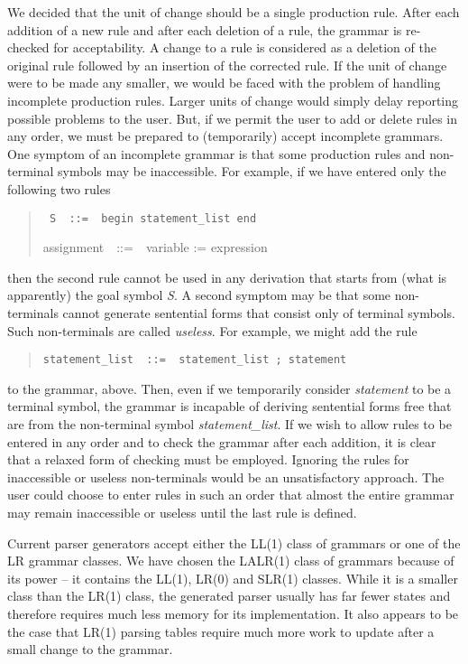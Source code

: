 We decided that the unit of change should be
a single production rule.
After each addition of a new rule and after each deletion of
a rule, the grammar is re-checked for acceptability.
A change to a rule is considered as a deletion of the original rule
followed by an insertion of the corrected rule.
If the unit of change were to be made any smaller, we would be
faced with the problem of handling incomplete production rules.
Larger units of change would simply delay reporting possible
problems to the user.
But, if we permit the user to add or delete rules in any order,
we must be prepared to (temporarily) accept incomplete grammars.
One symptom of an incomplete grammar is that some production rules
and non-terminal symbols may be inaccessible.
For example, if we have entered only the following two rules
\begin{quote}
\tt
S\ \ ::=\ \ begin  statement\_list  end

assignment\ \ ::=\ \ variable := expression
\end{quote}
then the second rule cannot be used in any derivation that starts
from (what is apparently) the goal symbol {\em S}.
A second symptom may be that some non-terminals cannot generate
sentential forms that consist only of terminal symbols.
Such non-terminals are called {\em useless}.
For example, we might add the rule
\begin{quote}
\tt statement\_list\ \ ::=\ \ statement\_list ; statement
\end{quote}
to the grammar, above.
Then, even if we temporarily consider {\em statement} to be
a terminal symbol, the grammar is incapable of deriving
sentential forms free that are from the non-terminal symbol
{\em statement\_list}.
If we wish to allow rules to be entered in any order and to check
the grammar after each addition, it is clear that a relaxed form
of checking must be employed.
Ignoring the rules for inaccessible or useless non-terminals
would be an unsatisfactory approach.
The user could choose to enter rules in such an order that almost
the entire grammar may remain inaccessible or useless until
the last rule is defined.

Current parser generators accept either the LL(1) class of grammars
or one of the LR grammar classes.
We have chosen the LALR(1) class of grammars because of its power -- it
contains the LL(1), LR(0) and SLR(1) classes.
While it is a smaller class than the LR(1) class, the generated parser
usually has far fewer states and therefore requires much less memory
for its implementation.
It also appears to be the case that LR(1) parsing tables require
much more work to update after a small change to the grammar.
